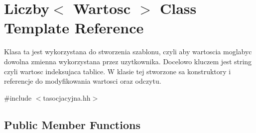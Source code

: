 \section{Liczby$<$ Wartosc $>$ Class Template Reference}
\label{class_liczby}


Klasa ta jest wykorzystana do stworzenia szablonu, czyli aby wartoscia moglabyc dowolna zmienna wykorzystana przez uzytkownika. Docelowo kluczem jest string czyli wartosc indeksujaca tablice. W klasie tej stworzone sa konstruktory i referencje do modyfikowania wartosci oraz odczytu.  




{\ttfamily \#include $<$tasocjacyjna.\-hh$>$}

\subsection*{Public Member Functions}
